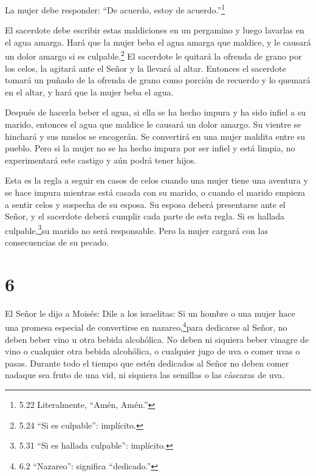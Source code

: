 La mujer debe responder: ``De acuerdo, estoy de acuerdo.''\footnote{5.22
  Literalmente, ``Amén, Amén.''}

 El sacerdote debe escribir estas maldiciones en un
pergamino y luego lavarlas en el agua amarga.  Hará que la
mujer beba el agua amarga que maldice, y le causará un dolor amargo si
es culpable.\footnote{5.24 ``Si es culpable'': implícito.} 
El sacerdote le quitará la ofrenda de grano por los celos, la agitará
ante el Señor y la llevará al altar.  Entonces el sacerdote
tomará un puñado de la ofrenda de grano como porción de recuerdo y lo
quemará en el altar, y hará que la mujer beba el agua.

 Después de hacerla beber el agua, si ella se ha hecho
impura y ha sido infiel a su marido, entonces el agua que maldice le
causará un dolor amargo. Su vientre se hinchará y sus muslos se
encogerán. Se convertirá en una mujer maldita entre su pueblo.
 Pero si la mujer no se ha hecho impura por ser infiel y
está limpia, no experimentará este castigo y aún podrá tener hijos.

 Esta es la regla a seguir en casos de celos cuando una
mujer tiene una aventura y se hace impura mientras está casada con su
marido,  o cuando el marido empieza a sentir celos y
sospecha de su esposa. Su esposa deberá presentarse ante el Señor, y el
sacerdote deberá cumplir cada parte de esta regla.  Si es
hallada culpable,\footnote{5.31 ``Si es hallada culpable'': implícito.}su
marido no será responsable. Pero la mujer cargará con las consecuencias
de su pecado.

\hypertarget{section-5}{%
\section{6}\label{section-5}}

 El Señor le dijo a Moisés:  Dile a los
israelitas: Si un hombre o una mujer hace una promesa especial de
convertirse en nazareo,\footnote{6.2 ``Nazareo'': significa
  ``dedicado.''}para dedicarse al Señor,  no deben beber
vino u otra bebida alcohólica. No deben ni siquiera beber vinagre de
vino o cualquier otra bebida alcohólica, o cualquier jugo de uva o comer
uvas o pasas.  Durante todo el tiempo que estén dedicados al
Señor no deben comer nadaque sea fruto de una vid, ni siquiera las
semillas o las cáscaras de uva.

